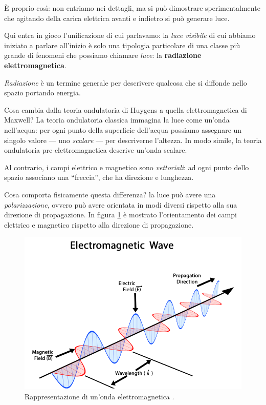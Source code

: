 \documentclass[a4paper,12pt]{article}
\begin{document}
È proprio così: non entriamo nei dettagli, ma si può dimostrare sperimentalmente che agitando della carica elettrica avanti e indietro si può generare luce.

Qui entra in gioco l'unificazione di cui parlavamo: la \emph{luce visibile} di cui abbiamo iniziato a parlare all'inizio è solo una tipologia particolare di una classe più grande di fenomeni che possiamo chiamare \emph{luce}: la \textbf{radiazione elettromagnetica}.

\emph{Radiazione} è un termine generale per descrivere qualcosa che si diffonde nello spazio portando energia.

Cosa cambia dalla teoria ondulatoria di Huygens a quella elettromagnetica di Maxwell?
La teoria ondulatoria classica immagina la luce come un'onda nell'acqua: per ogni punto della superficie dell'acqua possiamo assegnare un singolo valore --- uno \emph{scalare} --- per descriverne l'altezza.
In modo simile, la teoria ondulatoria pre-elettromagnetica descrive un'onda scalare.

Al contrario, i campi elettrico e magnetico sono \emph{vettoriali}: ad ogni punto dello spazio associano una ``freccia'', che ha direzione e lunghezza.

Cosa comporta fisicamente questa differenza? la luce può avere una \emph{polarizzazione}, ovvero può avere orientata in modi diversi rispetto alla sua direzione di propagazione. 
In figura \ref{fig:Electromagnetic-waves} è mostrato l'orientamento dei campi elettrico e magnetico rispetto alla direzione di propagazione.

\begin{figure}[ht]
\centering
\includegraphics[width=\textwidth]{800px-Electromagnetic_waves.png}
\caption{Rappresentazione di un'onda elettromagnetica \cite[]{dechammaklKnnddRr2018}.}
\label{fig:Electromagnetic-waves}
\end{figure}
\end{document}
